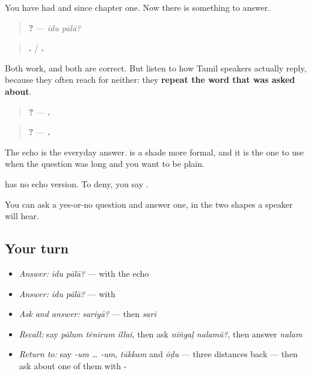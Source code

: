 \begin{grammarlens}[title={Grammar lens: two answers, and a third}]
You have had \textbf{} and \textbf{} since chapter one. Now there is something to answer.

\begin{quote}
\textbf{ ?} — \emph{idu pālā?}
\end{quote}

\begin{quote}
\textbf{.} / \textbf{.}
\end{quote}

Both work, and both are correct. But listen to how Tamil speakers actually reply, because they often reach for neither: they \textbf{repeat the word that was asked about}.

\begin{quote}
\textbf{ ?} — \textbf{.}
\end{quote}

\begin{quote}
\textbf{?} — \textbf{.}
\end{quote}

The echo is the everyday answer. \textbf{} is a shade more formal, and it is the one to use when the question was long and you want to be plain.

\textbf{} has no echo version. To deny, you say \textbf{}.
\end{grammarlens}

\begin{grammarlens}[title={What you've built}]
You can ask a yes-or-no question and answer one, in the two shapes a speaker will hear.
\end{grammarlens}

\subsection*{Your turn}
\begin{itemize}
\raggedright
  \item \emph{Answer:} \emph{idu pālā?} — with the echo
  \item \emph{Answer:} \emph{idu pālā?} — with 
  \item \emph{Ask and answer:} \emph{sariyā?} — then \emph{sari}
  \item \emph{Recall:} say \emph{pālum tēnīrum illai}, then ask \emph{nīṅgaḷ nalamā?}, then answer \emph{nalam}
  \item \emph{Return to:} say \emph{-um … -um}, \emph{tūkkam} and \emph{ōḍu} — three distances back — then ask about one of them with -
\end{itemize}

